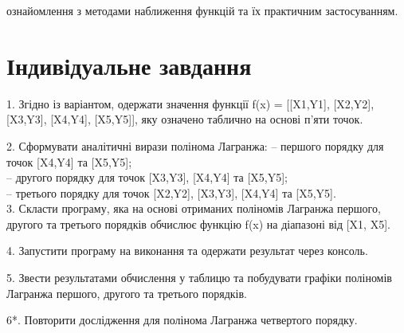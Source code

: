 \documentclass[a4paper, 12pt, oneside]{extarticle}
\begin{document}
\Margins


\begin{tcolorbox}[breakable, arc=0mm, colback=white, boxrule=0.2mm, beforeafter skip=0pt]
ознайомлення з методами наближення функцій та їх практичним застосуванням.
\end{tcolorbox}

\newcommand\tcobx[1]{
\begin{tcolorbox}[breakable, arc=0mm, colback=white, boxrule=0.2mm, beforeafter skip=0pt]
	#1
\end{tcolorbox}
}

\section*{Індивідуальне завдання}
\begin{tcolorbox}[breakable, arc=0mm, colback=white, boxrule=0.2mm, beforeafter skip=0pt]
	1. Згідно із варіантом, одержати значення функції f(x) = [[X1,Y1], [X2,Y2], [X3,Y3], [X4,Y4],
	[X5,Y5]], яку означено таблично на основі п’яти точок.

	2. Сформувати аналітичні вирази полінома Лагранжа:
	– першого порядку для точок [X4,Y4] та [X5,Y5]; \\
	– другого порядку для точок [X3,Y3], [X4,Y4] та [X5,Y5]; \\
	– третього порядку для точок [X2,Y2], [X3,Y3], [X4,Y4] та [X5,Y5]. \\

	3. Скласти програму, яка на основі отриманих поліномів Лагранжа першого, другого та
	третього порядків обчислює функцію f(x) на діапазоні від [X1, X5].

	4. Запустити програму на виконання та одержати результат через консоль.

	5. Звести результатами обчислення у таблицю та побудувати графіки поліномів Лагранжа
	першого, другого та третього порядків.

	6*. Повторити дослідження для полінома Лагранжа четвертого порядку.
\end{tcolorbox}
\end{document}
